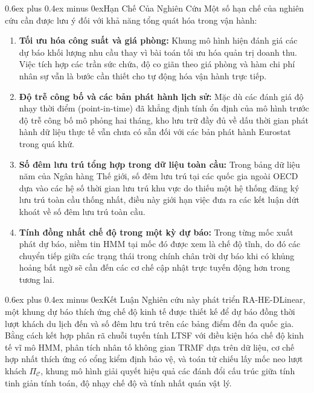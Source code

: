 \documentclass[10pt,journal,compsoc]{IEEEtran}
\makeatletter
\def\section{\@startsection{section}{1}{\z@}{-2.2ex plus -0.8ex minus -0.4ex}%
{0.6ex plus 0.4ex minus 0ex}{\normalfont\sublargesize\rmfamily\bfseries}}
\makeatother
\begin{document}
\section{\texorpdfstring{Hạn Chế Của Nghiên Cứu}{Han Che Cua Nghien Cuu}}
\label{sec:limitations}
Một số hạn chế của nghiên cứu cần được lưu ý đối với khả năng tổng quát hóa trong vận hành:
\begin{enumerate}\setlength{\itemsep}{1pt}\setlength{\parskip}{0pt}\setlength{\parsep}{0pt}
    \item \textbf{Tối ưu hóa công suất và giá phòng:} Khung mô hình hiện đánh giá các dự báo khối lượng nhu cầu thay vì bài toán tối ưu hóa quản trị doanh thu. Việc tích hợp các trần sức chứa, độ co giãn theo giá phòng và hàm chi phí nhân sự vẫn là bước cần thiết cho tự động hóa vận hành trực tiếp.
    \item \textbf{Độ trễ công bố và các bản phát hành lịch sử:} Mặc dù các đánh giá độ nhạy thời điểm (point-in-time) đã khẳng định tính ổn định của mô hình trước độ trễ công bố mô phỏng hai tháng, kho lưu trữ đầy đủ về dấu thời gian phát hành dữ liệu thực tế vẫn chưa có sẵn đối với các bản phát hành Eurostat trong quá khứ.
    \item \textbf{Số đêm lưu trú tổng hợp trong dữ liệu toàn cầu:} Trong bảng dữ liệu năm của Ngân hàng Thế giới, số đêm lưu trú tại các quốc gia ngoài OECD dựa vào các hệ số thời gian lưu trú khu vực do thiếu một hệ thống đăng ký lưu trú toàn cầu thống nhất, điều này giới hạn việc đưa ra các kết luận dứt khoát về số đêm lưu trú toàn cầu.
    \item \textbf{Tính đồng nhất chế độ trong một kỳ dự báo:} Trong từng mốc xuất phát dự báo, niềm tin HMM tại mốc đó được xem là chế độ tĩnh, do đó các chuyển tiếp giữa các trạng thái trong chính chân trời dự báo khi có khủng hoảng bất ngờ sẽ cần đến các cơ chế cập nhật trực tuyến động hơn trong tương lai.
\end{enumerate}

\section{\texorpdfstring{Kết Luận}{Ket Luan}}
\label{sec:conclusion}
Nghiên cứu này phát triển RA-HE-DLinear, một khung dự báo thích ứng chế độ kinh tế được thiết kế để dự báo đồng thời lượt khách du lịch đến và số đêm lưu trú trên các bảng điểm đến đa quốc gia. Bằng cách kết hợp phân rã chuỗi tuyến tính LTSF với điều kiện hóa chế độ kinh tế vĩ mô HMM, phân tích nhân tố không gian TRMF dựa trên dữ liệu, cơ chế hợp nhất thích ứng có cổng kiểm định bảo vệ, và toán tử chiếu lấy mốc neo lượt khách $\Pi_{\mathcal{C}}$, khung mô hình giải quyết hiệu quả các đánh đổi cấu trúc giữa tính tinh giản tính toán, độ nhạy chế độ và tính nhất quán vật lý.
\end{document}
